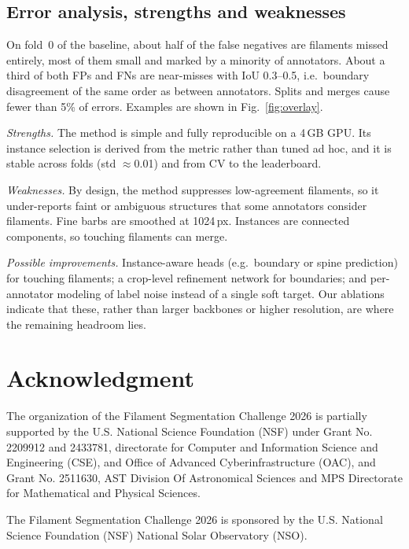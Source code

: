\documentclass[sigconf]{acmart}
\begin{document}
\subsection{Error analysis, strengths and weaknesses}
    On fold~0 of the baseline, about half of the false negatives are filaments missed entirely, most of them small and marked by a minority of annotators. About a third of both FPs and FNs are near-misses with IoU 0.3--0.5, i.e.\ boundary disagreement of the same order as between annotators. Splits and merges cause fewer than 5\% of errors. Examples are shown in Fig.~\ref{fig:overlay}.

    \textit{Strengths.} The method is simple and fully reproducible on a 4\,GB GPU. Its instance selection is derived from the metric rather than tuned ad hoc, and it is stable across folds (std $\approx$0.01) and from CV to the leaderboard.

    \textit{Weaknesses.} By design, the method suppresses low-agreement filaments, so it under-reports faint or ambiguous structures that some annotators consider filaments. Fine barbs are smoothed at 1024\,px. Instances are connected components, so touching filaments can merge.

    \textit{Possible improvements.} Instance-aware heads (e.g.\ boundary or spine prediction) for touching filaments; a crop-level refinement network for boundaries; and per-annotator modeling of label noise instead of a single soft target. Our ablations indicate that these, rather than larger backbones or higher resolution, are where the remaining headroom lies.


\section{Acknowledgment}\label{sec:acknowledgment}
    The organization of the Filament Segmentation Challenge 2026 is partially supported by the U.S. National Science Foundation (NSF) under Grant No. 2209912 and 2433781, directorate for Computer and Information Science and Engineering (CSE), and Office of Advanced Cyberinfrastructure (OAC), and Grant No. 2511630, AST Division Of Astronomical Sciences and MPS Directorate for Mathematical and Physical Sciences.

    The Filament Segmentation Challenge 2026 is sponsored by the U.S. National Science Foundation (NSF) National Solar Observatory (NSO).
\end{document}
